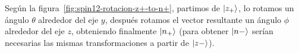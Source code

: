Según la figura~\ref{fig:spin12-rotacion-z+-to-n+},
partimos de $\ket{z_+}$, lo rotamos un ángulo $\theta$ alrededor del
eje $y$, después rotamos el vector resultante un ángulo $\phi$ alrededor del
eje $z$, obteniendo finalmente $\ket{n_+}$ (para obtener $\ket{n-}$ serían
necesarias las mismas transformaciones a partir de $\ket{z-}$).
\begin{figure}[ht]
  \newcommand{\colordirectrizfront}{black}
  \newcommand{\colordirectrizback}{black!50}
  \newcommand{\colormomento}{blue!85!black}
  \newcommand{\colorspinorplus}{green!60!black}
  \newcommand{\colorspinorplustext}{green!45!black}
  \newcommand{\colorspinorfantasma}{black!30}
  \newcommand{\colorspinorfantasmatext}{black!50}
  \newcommand{\colorhelicminus}{red!80!black}
  \newcommand{\colorhelicminustext}{red!80!black}
  \newcommand{\colorlinaux}{black!15}
  \newcommand{\colorndirector}{black!60}
  \newcommand{\colorelectron}{blue}
  \def\scl{.84}
  \pgfmathsetmacro{\PR}{\PMOD}
  \pgfmathsetmacro{\PTHETA}{\THETA}
  \pgfmathsetmacro{\PPHI}{\PHI}
  \pgfmathsetmacro{\HELMINR}{\PMOD}
  \pgfmathsetmacro{\ZPLUSZ}{\NMOD}
  \pgfmathsetmacro{\ZMINUSZ}{-\NMOD}    
  \pgfmathsetmacro{\DIRINITHETA}{\THETA}
  \pgfmathsetmacro{\DIRINIPHI}{\PHI}
  \pgfmathsetmacro{\DIRFINTHETA}{\THETA}
  \pgfmathsetmacro{\DIRFINPHI}{\PHI}

\end{figure}
